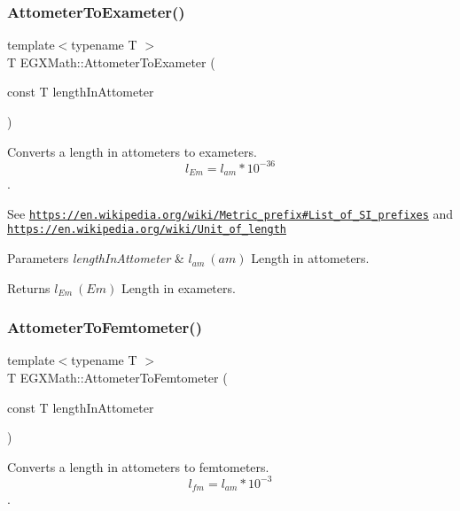 \subsubsection{\texorpdfstring{Attometer\+To\+Exameter()}{AttometerToExameter()}}
{\footnotesize\ttfamily template$<$typename T $>$ \\
T E\+G\+X\+Math\+::\+Attometer\+To\+Exameter (\begin{DoxyParamCaption}\item[{const T}]{length\+In\+Attometer }\end{DoxyParamCaption})}



Converts a length in attometers to exameters. \[ l_{Em}=l_{am} * 10^{-36} \]. 

See \href{https://en.wikipedia.org/wiki/Metric_prefix#List_of_SI_prefixes}{\tt https\+://en.\+wikipedia.\+org/wiki/\+Metric\+\_\+prefix\#\+List\+\_\+of\+\_\+\+S\+I\+\_\+prefixes} and \href{https://en.wikipedia.org/wiki/Unit_of_length}{\tt https\+://en.\+wikipedia.\+org/wiki/\+Unit\+\_\+of\+\_\+length} 
\begin{DoxyParams}{Parameters}
{\em length\+In\+Attometer} & $ l_{am}\ (am)$ Length in attometers. \\
\hline
\end{DoxyParams}
\begin{DoxyReturn}{Returns}
$ l_{Em}\ (Em)$ Length in exameters. 
\end{DoxyReturn}
\mbox{\label{group___e_g_x_math-_conversions-_length_conversions-_attometer-_s_i_gafbaa622bc31794c382e244942fa1d445}} 
\subsubsection{\texorpdfstring{Attometer\+To\+Femtometer()}{AttometerToFemtometer()}}
{\footnotesize\ttfamily template$<$typename T $>$ \\
T E\+G\+X\+Math\+::\+Attometer\+To\+Femtometer (\begin{DoxyParamCaption}\item[{const T}]{length\+In\+Attometer }\end{DoxyParamCaption})}



Converts a length in attometers to femtometers. \[ l_{fm}=l_{am} * 10^{-3} \]. 

